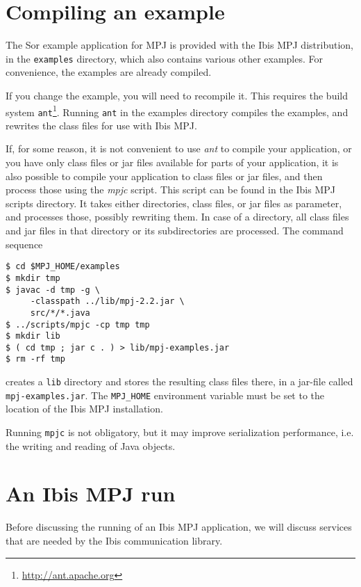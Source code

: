 \documentclass[a4paper,10pt]{article}
\begin{document}
\section{Compiling an example}

The Sor example application for MPJ is
provided with the Ibis MPJ distribution, in the \texttt{examples} directory,
which also contains various other examples.
For convenience, the examples are already compiled.

If you change the example, you will need to recompile it. This
requires the build system \texttt{ant}\footnote{\url{http://ant.apache.org}}.
Running \texttt{ant} in the examples directory compiles the examples,
and rewrites the class files for use with Ibis MPJ.

If, for some reason, it is not convenient to use \emph{ant} to compile
your application, or you have only class files or jar files available
for parts of your application, it is also possible to compile
your application to class files or jar files, and then process those
using the \emph{mpjc} script. This script can be found in the Ibis MPJ
scripts directory. It takes either directories, class files, or jar files
as parameter, and processes those, possibly rewriting them. In case
of a directory, all class files and jar files in that directory or
its subdirectories are processed.  The command sequence

\begin{verbatim}
$ cd $MPJ_HOME/examples
$ mkdir tmp
$ javac -d tmp -g \
     -classpath ../lib/mpj-2.2.jar \
     src/*/*.java
$ ../scripts/mpjc -cp tmp tmp
$ mkdir lib
$ ( cd tmp ; jar c . ) > lib/mpj-examples.jar
$ rm -rf tmp
\end{verbatim}

creates a \texttt{lib} directory and stores the resulting class files there,
in a jar-file called \texttt{mpj-examples.jar}.
The \texttt{MPJ\_HOME} environment variable must be set to the location of
the Ibis MPJ installation.

Running \texttt{mpjc} is not obligatory, but it may improve 
serialization performance, i.e. the writing and reading of Java objects.

\section{An Ibis MPJ run}

Before discussing
the running of an Ibis MPJ application, we will discuss services that are
needed by the Ibis communication library.
\end{document}

